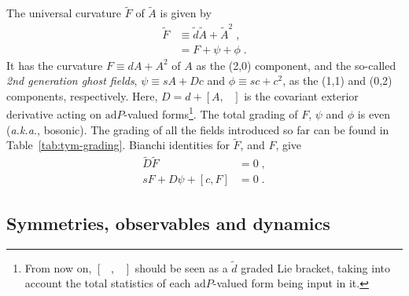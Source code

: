 \documentclass[main.tex]{subfiles}
\begin{document}
The universal curvature $ \tilde{F} $ of $\tilde{A}$ is given by
\begin{subequations}\label{eq:universal-curvature}
  \begin{align}
    \tilde{F} & \equiv \tilde{d}\tilde{A}+\tilde{A}^2\;, \\
              & = F+\psi+\phi \;.
  \end{align}
\end{subequations}
It has the curvature $F\equiv dA+A^2$ of $A$ as the (2,0) component, and the so-called \emph{2nd generation ghost fields}, $\psi \equiv sA + Dc$ and $\phi \equiv sc + c^2$, as the (1,1) and (0,2) components, respectively. Here, $D=d+ \left[ A, \phantom{A} \right]$ is the covariant exterior derivative acting on $\mathrm{ad}P$-valued forms\footnote{From now on, $\left[ \phantom{ A }, \phantom{ A } \right]$ should be seen as a $\tilde{d}$ graded Lie bracket, taking into account the total statistics of each $\mathrm{ad}P$-valued form being input in it.}. The total grading of $F$, $\psi$ and $\phi$ is even (\textit{a.k.a.}, bosonic). The grading of all the fields introduced so far can be found in Table~\ref{tab:tym-grading}. Bianchi identities for $\tilde{F}$, and $F$, give
\begin{subequations}\label{eq:universal-bianchi-identity}
  \begin{align}
    \tilde{D}\tilde{F}          & =0 \;,  \\
    sF+D\psi+\left[ c,F \right] & = 0 \;.
  \end{align}
\end{subequations}

\subsection{Symmetries, observables and dynamics}\label{ssec:sym-and-obs;sec:tym}
\end{document}
